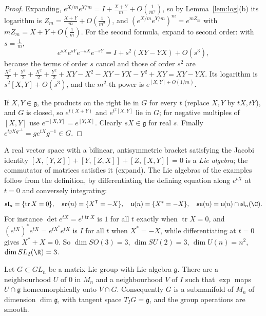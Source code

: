 \begin{proof}
Expanding, $e^{X/m}e^{Y/m}=I+\frac{X+Y}m+O(\frac1{m^2})$, so by Lemma~\ref{lem:log}(b) its logarithm is $Z_m=\frac{X+Y}m+O(\frac1{m^2})$, and $(e^{X/m}e^{Y/m})^m=e^{mZ_m}$ with
$mZ_m=X+Y+O(\frac1m)$. For the second formula, expand to second order: with $s=\frac1m$,
\[e^{sX}e^{sY}e^{-sX}e^{-sY}=I+s^2(XY-YX)+O(s^3),\]
because the terms of order $s$ cancel and those of order $s^2$ are $\frac{X^2}2+\frac{Y^2}2+\frac{X^2}2+\frac{Y^2}2+XY-X^2-XY-YX-Y^2+XY=XY-YX$. Its logarithm is $s^2[X,Y]+O(s^3)$, and the $m^2$-th power is
$e^{[X,Y]+O(1/m)}$.

If $X,Y\in\mathfrak g$, the products on the right lie in $G$ for every $t$ (replace $X,Y$ by $tX,tY$), and $G$ is closed, so $e^{t(X+Y)}$ and $e^{t^2[X,Y]}$ lie in $G$; for negative multiples of $[X,Y]$ use
$e^{-[X,Y]}=e^{[Y,X]}$. Clearly $sX\in\mathfrak g$ for real $s$. Finally $e^{tgXg^{-1}}=ge^{tX}g^{-1}\in G$.
\end{proof}

A real vector space with a bilinear, antisymmetric bracket satisfying the Jacobi identity $[X,[Y,Z]]+[Y,[Z,X]]+[Z,[X,Y]]=0$ is a \emph{Lie algebra}; the commutator of matrices satisfies it (expand). The
Lie algebras of the examples follow from the definition, by differentiating the defining equation along $e^{tX}$ at $t=0$ and conversely integrating:
\[\mathfrak{sl}_n=\{\operatorname{tr}X=0\},\quad\mathfrak{so}(n)=\{X^{\mathsf T}=-X\},\quad\mathfrak u(n)=\{X^*=-X\},\quad\mathfrak{su}(n)=\mathfrak u(n)\cap\mathfrak{sl}_n(\C).\]
For instance $\det e^{tX}=e^{t\operatorname{tr}X}$ is $1$ for all $t$ exactly when $\operatorname{tr}X=0$, and $(e^{tX})^*e^{tX}=e^{tX^*}e^{tX}$ is $I$ for all $t$ when $X^*=-X$, while differentiating at $t=0$ gives $X^*+X=0$.
So $\dim SO(3)=3$, $\dim SU(2)=3$, $\dim U(n)=n^2$, $\dim SL_2(\R)=3$.

\begin{theorem}\label{thm:closedsubgroup}
Let $G\subset GL_n$ be a matrix Lie group with Lie algebra $\mathfrak g$. There are a neighbourhood $U$ of $0$ in $M_n$ and a neighbourhood $V$ of $I$ such that $\exp$ maps $U\cap\mathfrak g$
homeomorphically onto $V\cap G$. Consequently $G$ is a submanifold of $M_n$ of dimension $\dim\mathfrak g$, with tangent space $T_IG=\mathfrak g$, and the group operations are smooth.
\end{theorem}

